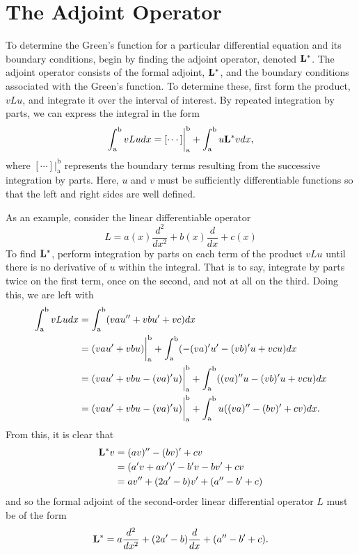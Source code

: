 \section{The Adjoint Operator}
To determine the Green's function for a particular differential equation and its boundary conditions, begin by finding the adjoint operator, denoted \(\mathcal{\mathrm{\bf{L^*}}  }\). The adjoint operator consists of the formal adjoint, \(\mathrm{\bf{L^*}}  \), and the boundary conditions associated with the Green's function. To determine these, first form the product, \(vLu\), and integrate it over the interval of interest. By repeated integration by parts, we can express the integral in the form
\begin{equation} \label{eq:adjoint}
	\int_\mathrm{a}^\mathrm{b} vLu dx = [\cdots]\biggr\rvert_\mathrm{a}^\mathrm{b} + \int_\mathrm{a}^\mathrm{b} u\mathrm{\bf{L^*}}  v dx,
\end{equation}
where \([\cdots]\biggr\rvert_\mathrm{a}^\mathrm{b}\) represents the boundary terms resulting from the successive integration by parts. Here, \(u\) and \(v\) must be sufficiently differentiable functions so that the left and right sides are well defined. 

As an example, consider the linear differentiable operator
\begin{equation}
	L= a(x) \frac{d^2}{dx^2} + b(x)\frac{d}{dx} + c(x)
\end{equation}
To find \(\mathrm{\bf{L^*}}  \), perform integration by parts on each term of the product \(vLu\) until there is no derivative of \(u\) within the integral. That is to say, integrate by parts twice on the first term, once on the second, and not at all on the third. Doing this, we are left with
\begin{equation}
	\begin{split}
		\int_\mathrm{a}^\mathrm{b} vLu dx &= \int_\mathrm{a}^\mathrm{b} (vau''+ vbu' + vc)dx\\
		&=(vau'+vbu)\biggr\rvert_\mathrm{a}^\mathrm{b} + \int_\mathrm{a}^\mathrm{b} (-(va)'u'-(vb)'u+vcu)dx\\
		&=(vau'+vbu-(va)'u)\biggr\rvert_\mathrm{a}^\mathrm{b} + \int_\mathrm{a}^\mathrm{b} ((va)''u-(vb)'u+vcu)dx\\
		&=(vau'+vbu-(va)'u)\biggr\rvert_\mathrm{a}^\mathrm{b} + \int_\mathrm{a}^\mathrm{b} u((va)''-(bv)'+cv)dx.
	\end{split}
\end{equation}
From this, it is clear that 
\begin{equation}
	\begin{split}
		\mathrm{\bf{L^*}} v &= (av)''-(bv)'+cv\\
		     &= (a'v+av')'-b'v-bv'+cv\\
		     &= av''+(2a'-b)v'+(a''-b'+c)
	\end{split}
\end{equation}
and so the formal adjoint of the second-order linear differential operator \(L\) must be of the form
\begin{equation}
	\mathrm{\bf{L^*}} =a\frac{d^2}{dx^2} + (2a'-b)\frac{d}{dx}+(a''-b'+c).
\end{equation}


